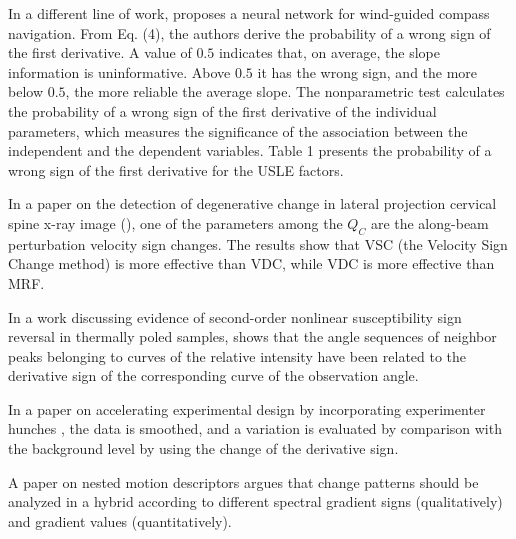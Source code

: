 \documentclass[11pt]{book}
\begin{document}
In a different line of work, \cite{sonneveld2003nonparametric} proposes a neural network for wind-guided compass navigation. From Eq. (4),  the authors derive
the probability of a wrong sign of the first derivative. A value of
$0.5$ indicates that, on average, the slope information is uninformative.
Above $0.5$ it has the wrong sign, and the more below $0.5$, the
more reliable the average slope. The nonparametric test calculates
the probability of a wrong sign of the first derivative of the individual
parameters, which measures the significance of the association between the independent and the dependent variables. Table 1 presents the probability of a
wrong sign of the first derivative for the USLE factors.

In a paper on the detection of degenerative change in lateral projection cervical spine
x-ray image (\cite{liu2005identifying}), one of the parameters among the $Q_{C}$ are the
along-beam perturbation velocity sign changes. The results show that VSC (the Velocity
Sign Change method) is more effective than VDC, while VDC is more
effective than MRF.

In a work discussing evidence of second-order nonlinear susceptibility sign reversal in
thermally poled samples, \cite{nevzorov2006glory} shows that the angle sequences of neighbor peaks
belonging to curves of the relative intensity have been related to
the derivative sign of the corresponding curve of the observation
angle.

In a paper on accelerating experimental design by incorporating experimenter hunches \cite{parrot2011statistical}, the data is smoothed, and a variation
is evaluated by comparison with the background level by using
the change of the derivative sign.

A paper on nested motion descriptors \cite{chen2013spectral} argues that change patterns should be analyzed in
a hybrid according to different spectral gradient signs (qualitatively)
and gradient values (quantitatively).
\end{document}
